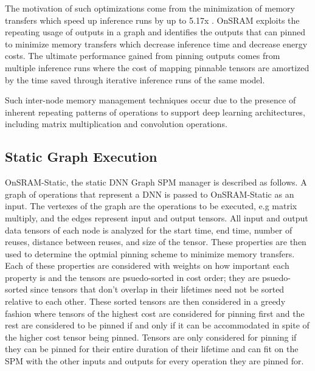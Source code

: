 The motivation of such optimizations come from the minimization of memory
transfers which speed up inference runs by up to 5.17x \cite{onsram}. OnSRAM
exploits the repeating usage of outputs in a graph and identifies the outputs
that can pinned to minimize memory transfers which decrease inference time and
decrease energy costs. The ultimate performance gained from pinning outputs
comes from multiple inference runs where the cost of mapping pinnable tensors
are amortized by the time saved through iterative inference runs of the same
model.

Such inter-node memory management techniques occur due to the presence of
inherent repeating patterns of operations to support deep learning
architectures, including matrix multiplication and convolution operations.



\subsection{Static Graph Execution}

OnSRAM-Static, the static DNN Graph SPM manager is described as follows. A
graph of operations that represent a DNN is passed to OnSRAM-Static as an
input. The vertexes of the graph are the operations to be executed, e.g matrix
multiply, and the edges represent input and output tensors.  All input and
output data tensors of each node is analyzed for the start time, end time,
number of reuses, distance between reuses, and size of the tensor. These
properties are then used to determine the optmial pinning scheme to minimize
memory transfers. Each of these properties are considered with weights on how
important each property is and the tensors are psuedo-sorted in cost order;
they are psuedo-sorted since tensors that don't overlap in their lifetimes need
not be sorted relative to each other. These sorted tensors are then considered
in a greedy fashion where tensors of the highest cost are considered for
pinning first and the rest are considered to be pinned if and only if it can be
accommodated in spite of the higher cost tensor being pinned. Tensors are only
considered for pinning if they can be pinned for their entire duration of their
lifetime and can fit on the SPM with the other inputs and outputs for every
operation they are pinned for.

